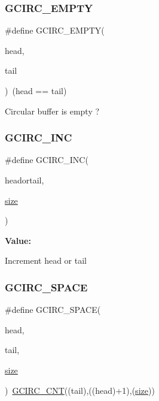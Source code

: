 \subsubsection{\texorpdfstring{GCIRC\_EMPTY}{GCIRC\_EMPTY}}
{\footnotesize\ttfamily \#define G\+C\+I\+R\+C\+\_\+\+E\+M\+P\+TY(\begin{DoxyParamCaption}\item[{}]{head,  }\item[{}]{tail }\end{DoxyParamCaption})~(head == tail)}

Circular buffer is empty ? \mbox{\label{group__gmacd__defines_gafd62a355f7480b793be721ba4c754813}} 
\subsubsection{\texorpdfstring{GCIRC\_INC}{GCIRC\_INC}}
{\footnotesize\ttfamily \#define G\+C\+I\+R\+C\+\_\+\+I\+NC(\begin{DoxyParamCaption}\item[{}]{headortail,  }\item[{}]{\mbox{\hyperlink{sun4u_2tte_8h_a245260f6f74972558f61b85227df5aae}{size}} }\end{DoxyParamCaption})}

{\bfseries Value\+:}
\begin{DoxyCode}{0}
\DoxyCodeLine{    \}}

\end{DoxyCode}
Increment head or tail \mbox{\label{group__gmacd__defines_gad48958fa52a1e9dc9a08d33210bcd9e0}} 
\subsubsection{\texorpdfstring{GCIRC\_SPACE}{GCIRC\_SPACE}}
{\footnotesize\ttfamily \#define G\+C\+I\+R\+C\+\_\+\+S\+P\+A\+CE(\begin{DoxyParamCaption}\item[{}]{head,  }\item[{}]{tail,  }\item[{}]{\mbox{\hyperlink{sun4u_2tte_8h_a245260f6f74972558f61b85227df5aae}{size}} }\end{DoxyParamCaption})~\mbox{\hyperlink{group__gmacd__defines_gaf979fcaac59bf6578901fc3fa40c7255}{G\+C\+I\+R\+C\+\_\+\+C\+NT}}((tail),((head)+1),(\mbox{\hyperlink{sun4u_2tte_8h_a245260f6f74972558f61b85227df5aae}{size}}))}

